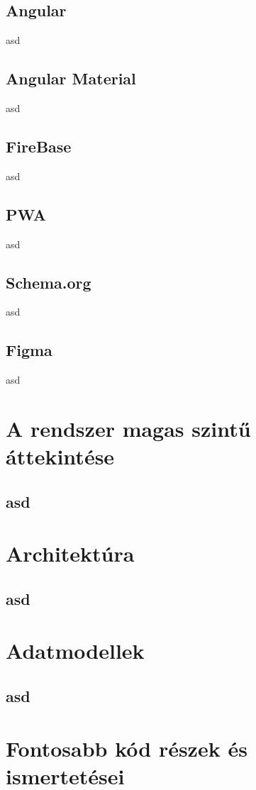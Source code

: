 \documentclass[12pt]{report}
\theoremstyle{definition}
\begin{document}
\section{Angular}
asd

\section{Angular Material}
asd

\section{FireBase}
asd

\section{PWA}
asd

\section{Schema.org}
asd

\section{Figma}
asd

\chapter{A rendszer magas szintű áttekintése}
\section{asd}


\chapter{Architektúra}
\section{asd}


\chapter{Adatmodellek}
\section{asd}


\chapter{Fontosabb kód részek és ismertetései}
\end{document}
